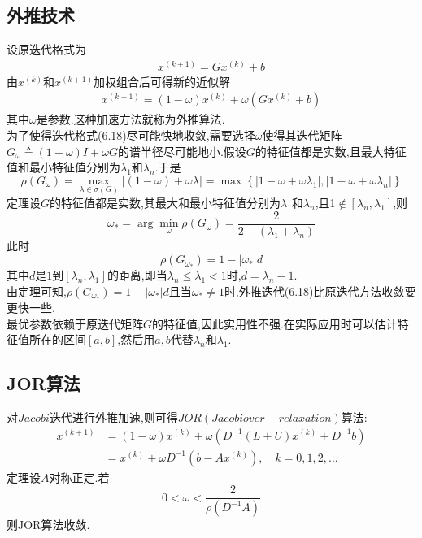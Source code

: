 \documentclass[12pt,a4paper]{article}
\begin{document}
\subsection{\color{blue}外推技术}
设原迭代格式为
\begin{align*}
x^{(k+1)}=G x^{(k)}+b
\tag{6.17}
\end{align*}
由$x^{(k)}$和$x^{(k+1)}$加权组合后可得新的近似解
\begin{align*}
x^{(k+1)}=(1-\omega) x^{(k)}+\omega\left(G x^{(k)}+b\right)
\tag{6.18}
\end{align*}
其中$\omega$是参数.这种加速方法就称为{\color{blue}外推算法}.\\
为了使得迭代格式(6.18)尽可能快地收敛,需要选择$\omega$使得其迭代矩阵$G_{\omega} \triangleq(1-\omega) I+\omega G$的谱半径尽可能地小.假设$G$的特征值都是实数,且最大特征值和最小特征值分别为$\lambda_{1}$和$\lambda_{n}$.于是
$$
\rho\left(G_{\omega}\right)=\max _{\lambda \in \sigma(G)}|(1-\omega)+\omega \lambda|=\max \left\{\left|1-\omega+\omega \lambda_{1}\right|,\left|1-\omega+\omega \lambda_{n}\right|\right\}
$$
{\color{blue}定理}\qquad 设$G$的特征值都是实数,其最大和最小特征值分别为$\lambda_{1}$和$\lambda_{n}$,且1$\notin\left[\lambda_{n}, \lambda_{1}\right]$,则
$$
\omega_{*}=\arg \min _{\omega} \rho\left(G_{\omega}\right)=\frac{2}{2-\left(\lambda_{1}+\lambda_{n}\right)}
$$
此时
$$
\rho\left(G_{\omega_{*}}\right)=1-\left|\omega_{*}\right| d
$$
其中$d$是$1$到$\left[\lambda_{n}, \lambda_{1}\right]$的距离,即当$\lambda_{n} \leq \lambda_{1}<1$时,$d=\lambda_{n}-1$.\\
由定理可知,$\rho\left(G_{\omega_{*}}\right)=1-\left|\omega_{*}\right| d$且当$\omega_{*} \neq 1$时,外推迭代(6.18)比原迭代方法收敛要更快一些.\\
最优参数依赖于原迭代矩阵$G$的特征值,因此实用性不强.在实际应用时可以估计特征值所在的区间$[a, b]$,然后用$a,b$代替$\lambda_{n}$和$\lambda_{1}$.
\subsection*{JOR算法}
对$Jacobi$迭代进行外推加速,则可得$JOR (Jacobi over-relaxation)$算法:
$$
\begin{aligned} x^{(k+1)} &=(1-\omega) x^{(k)}+\omega\left(D^{-1}(L+U) x^{(k)}+D^{-1} b\right) \\ &=x^{(k)}+\omega D^{-1}\left(b-A x^{(k)}\right), \quad k=0,1,2, \ldots \end{aligned}
$$
{\color{blue}定理}\qquad 设$A$对称正定.若
$$
0<\omega<\frac{2}{\rho\left(D^{-1} A\right)}
$$
则JOR算法收敛.\\
\end{document}
